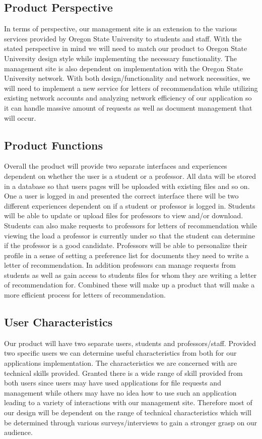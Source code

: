 \documentclass[onecolumn, draftclsnofoot,10pt, compsoc]{IEEEtran}
\begin{document}
\subsection{Product Perspective} 
In terms of perspective, our management site is an extension to the various services provided by Oregon State University to students and staff. With the stated perspective in mind we will need to match our product to Oregon State University design style while implementing the necessary functionality. The management site is also dependent on implementation with the Oregon State University network. With both design/functionality and network necessities, we will need to implement a new service for letters of recommendation while utilizing existing network accounts and analyzing network efficiency of our application so it can handle massive amount of requests as well as document management that will occur. 

\subsection{Product Functions}
Overall the product will provide two separate interfaces and experiences dependent on whether the user is a student or a professor. All data will be stored in a database so that users pages will be uploaded with existing files and so on. One a user is logged in and presented the correct interface there will be two different experiences dependent on if a student or professor is logged in. Students will be able to update or upload files for professors to view and/or download. Students can also make requests to professors for letters of recommendation while viewing the load a professor is currently under so that the student can determine if the professor is a good candidate. Professors will be able to personalize their profile in a sense of setting a preference list for documents they need to write a letter of recommendation. In addition professors can manage requests from students as well as gain access to students files for whom they are writing a letter of recommendation for. Combined these will make up a product that will make a more efficient process for letters of recommendation. 

\subsection{User Characteristics}
Our product will have two separate users, students and professors/staff. Provided two specific users we can determine useful characteristics from both for our applications implementation. The characteristics we are concerned with are technical skills provided. Granted there is a wide range of skill provided from both users since users may have used applications for file requests and management while others may have no idea how to use such an application leading to a variety of interactions with our management site. Therefore most of our design will be dependent on the range of technical characteristics which will be determined through various surveys/interviews to gain a stronger grasp on our audience. 
\end{document}

